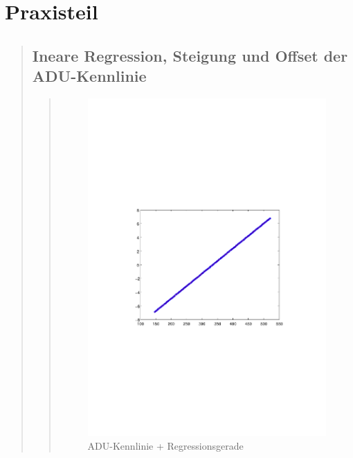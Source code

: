 \section{Praxisteil}
\begin{quote}
    
    \subsection{Ineare Regression, Steigung und Offset der ADU-Kennlinie}
    \begin{quote}
        
        \begin{figure}[H]
        \centering
            \includegraphics[scale=0.7, trim = 30mm 90mm 30mm 90mm, clip]{Bilder/ADUKennlinieplusRegr_V}
                \caption{ADU-Kennlinie + Regressionsgerade}
                \label{fig:ADUKennlinieplusRegr}
        \end{figure}
        

\end{quote}
\end{quote}
